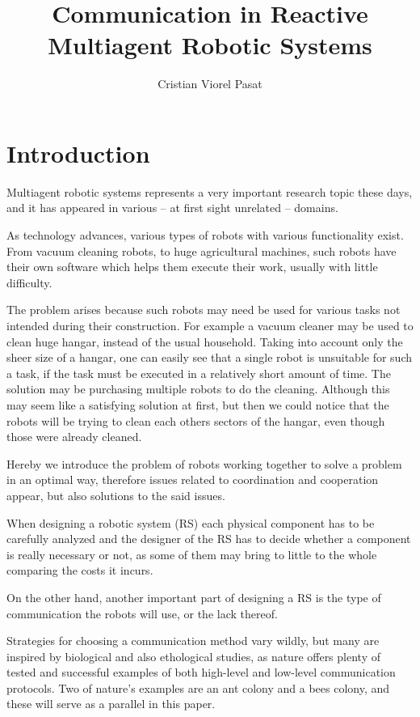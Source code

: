 \documentclass[12pt]{report}
\begin{document}
\author{Cristian Viorel Pasat}
\title{Communication in Reactive Multiagent Robotic Systems}
\maketitle





\chapter{Introduction}

Multiagent robotic systems represents a very important  research topic these days, and it has appeared in various -- at first sight unrelated -- domains.

As technology advances, various types of robots with various functionality exist. From vacuum cleaning robots, to huge agricultural machines, such robots have their own software which helps them execute their work, usually with little difficulty. 

The problem arises because such robots may need be used for various tasks not intended during their construction. For example a vacuum cleaner may be used to clean huge hangar, instead of the usual household. Taking into account only the sheer size of a hangar, one can easily see that a single robot is unsuitable for such a task, if the task must be executed in a relatively short amount of time. The solution may be purchasing multiple robots to do the cleaning. Although this may seem like a satisfying solution at first, but then we could notice that the robots will be trying to clean each others sectors of the hangar, even though those were already cleaned.

Hereby we introduce the problem of robots working together to solve a problem in an optimal way, therefore issues related to coordination and  cooperation appear, but also solutions to the said issues.



When designing a robotic system (RS) each physical component has to be carefully analyzed and the designer of the RS has to decide whether a component is really necessary or not, as some of them may bring to little to the whole comparing the costs it incurs.


On the other hand, another important part of designing a RS is the type of communication the robots will use, or the lack thereof.

Strategies for choosing a communication method vary wildly, but many are inspired by biological and also ethological studies, as nature offers  plenty of tested and successful examples of both high-level and low-level communication protocols. Two of nature's examples are an ant colony and a  bees colony, and these will serve as a parallel in this paper.
\end{document}
